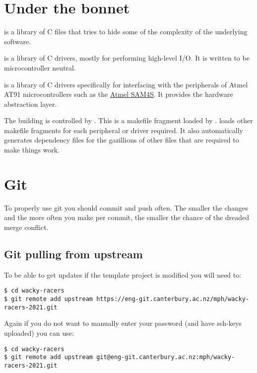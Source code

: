\section{Under the bonnet}
\label{under-the-bonnet}

 is a library of C files that tries to hide some of the
complexity of the underlying software.

 is a library of C drivers, mostly for performing high-level I/O.
It is written to be microcontroller neutral.

 is a library of C drivers specifically for interfacing with the
peripherals of Atmel AT91 microcontrollers such as the
\href{Atmel_SAM4S}{Atmel SAM4S}. It provides the hardware abstraction
layer.

The building is controlled by . This is a
makefile fragment loaded by .
 loads other makefile fragments for each
peripheral or driver required. It also automatically generates
dependency files for the gazillions of other files that are required to
make things work.

\section{Git}
\label{git}

To properly use git you should commit and push often. The smaller the
changes and the more often you make per commit, the smaller the chance
of the dreaded merge conflict.

\subsection{Git pulling from upstream}
\label{git-pulling-from-upstream}

To be able to get updates if the template project is modified you will
need to:

\begin{verbatim}
$ cd wacky-racers 
$ git remote add upstream https://eng-git.canterbury.ac.nz/mph/wacky-racers-2021.git  
\end{verbatim}

Again if you do not want to manually enter your password (and have
ssh-keys uploaded) you can use:
%
\begin{verbatim}
$ cd wacky-racers 
$ git remote add upstream git@eng-git.canterbury.ac.nz:mph/wacky-racers-2021.git
\end{verbatim}

